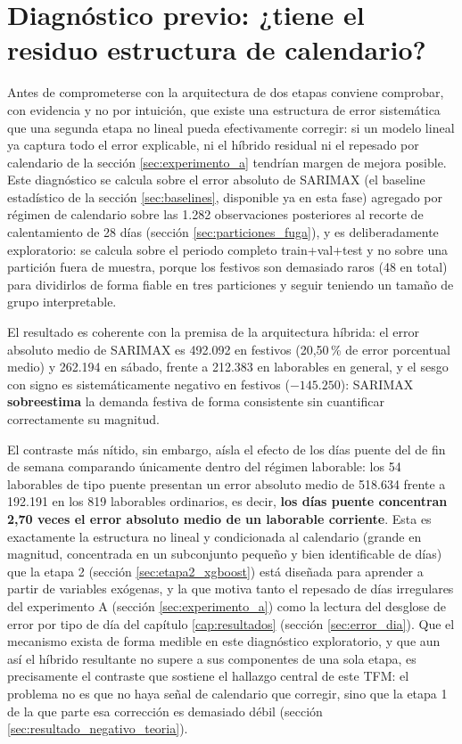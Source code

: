 \section{Diagnóstico previo: ¿tiene el residuo estructura de calendario?}\label{sec:diagnostico_previo}

Antes de comprometerse con la arquitectura de dos etapas conviene comprobar, con
evidencia y no por intuición, que existe una estructura de error sistemática que una
segunda etapa no lineal pueda efectivamente corregir: si un modelo lineal ya captura todo
el error explicable, ni el híbrido residual ni el repesado por calendario de la sección
\ref{sec:experimento_a} tendrían margen de mejora posible. Este diagnóstico se calcula
sobre el error absoluto de SARIMAX (el baseline estadístico de la sección
\ref{sec:baselines}, disponible ya en esta fase) agregado por régimen de calendario sobre
las 1.282 observaciones posteriores al recorte de calentamiento de 28 días (sección
\ref{sec:particiones_fuga}), y es deliberadamente exploratorio: se calcula sobre el
periodo completo train+val+test y no sobre una partición fuera de muestra, porque los
festivos son demasiado raros (48 en total) para dividirlos de forma fiable en tres
particiones y seguir teniendo un tamaño de grupo interpretable.

El resultado es coherente con la premisa de la arquitectura híbrida: el error absoluto
medio de SARIMAX es 492.092 en festivos (20,50\,\% de error porcentual medio) y 262.194
en sábado, frente a 212.383 en laborables en general, y el sesgo con signo es
sistemáticamente negativo en festivos ($-145.250$): SARIMAX \textbf{sobreestima} la
demanda festiva de forma consistente sin cuantificar correctamente su magnitud.

El contraste más nítido, sin embargo, aísla el efecto de los días puente del de fin de
semana comparando únicamente dentro del régimen laborable: los 54 laborables de tipo
puente presentan un error absoluto medio de 518.634 frente a 192.191 en los 819 laborables
ordinarios, es decir, \textbf{los días puente concentran 2,70 veces el error absoluto
medio de un laborable corriente}. Esta es exactamente la estructura no lineal y
condicionada al calendario (grande en magnitud, concentrada en un subconjunto pequeño y
bien identificable de días) que la etapa 2 (sección \ref{sec:etapa2_xgboost}) está
diseñada para aprender a partir de variables exógenas, y la que motiva tanto el repesado
de días irregulares del experimento A (sección \ref{sec:experimento_a}) como la lectura
del desglose de error por tipo de día del capítulo \ref{cap:resultados} (sección
\ref{sec:error_dia}). Que el mecanismo exista de forma medible en este diagnóstico
exploratorio, y que aun así el híbrido resultante no supere a sus componentes de una sola
etapa, es precisamente el contraste que sostiene el hallazgo central de este TFM: el
problema no es que no haya señal de calendario que corregir, sino que la etapa 1 de la que
parte esa corrección es demasiado débil (sección \ref{sec:resultado_negativo_teoria}).

